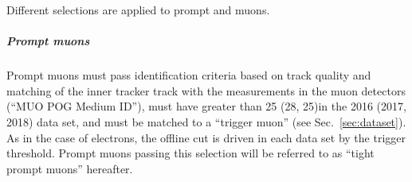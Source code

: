 Different selections are applied to prompt and \displ muons.
\subparagraph {Prompt muons}
Prompt muons must pass identification criteria based on track quality
and matching of the inner tracker track with the measurements in the
muon detectors (``MUO POG Medium ID''), must have \pt greater than
25 (28, 25)\GeV in the 2016 (2017, 2018) data set, and must be matched
to a ``trigger muon'' (see Sec.~\ref{sec:dataset}).
As in the case of electrons, the offline \pt cut is driven in each
data set by the trigger \pt threshold.
Prompt muons passing this selection will be referred to as ``tight
prompt muons'' hereafter.
\begin{table}[h!]
  \centering
  \caption{\label{tab:muonSelection} Requirements for a muon
    to pass each of the defined selection working points.}
\end{table}
